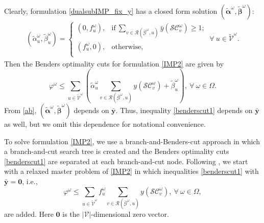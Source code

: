 \documentclass[a4paper,10pt]{article}
\theoremstyle{plain}
\newcommand{\revv}[1]{{#1}}
\begin{document}
{	%
	Clearly, formulation \eqref{dualsubIMP_fix_y} has a closed form solution \revv{$(\tilde{\boldsymbol{{\alpha}}}^{\omega},\tilde{\boldsymbol{{\beta}}}^{\omega})$:
		\begin{equation}\label{ab}
			\begin{aligned}
				(\tilde{\alpha}_u^{\omega},\tilde{\beta}_u^{\omega})=\left\{
				\begin{array}{ll}
					(0,f_u^{\omega}),& {\text{if}}~\sum_{v\in\mathcal{R}(\bar{\mathcal{G}}^{\omega},u)}\bar{y}(\mathcal{SC}_v^{\omega})\geq 1;\\[3pt]
					(f_u^{\omega},0),& \text{otherwise},\\
				\end{array}\right. ~  \forall ~u \in \tilde{\mathcal{V}}^{\omega}.
			\end{aligned}
	\end{equation}}%
	Then the Benders optimality cuts for formulation \eqref{IMP2} are given by
	\revv{\begin{equation}\label{benderscut1}
			\varphi^{\omega}\leq\sum_{u\in\tilde{\mathcal{V}}^{\omega}}\left(\tilde{\alpha}_u^{\omega}\sum_{v\in\mathcal{R}(\bar{\mathcal{G}}^{\omega},u)}y(\mathcal{SC}_v^{\omega})+\tilde{\beta}_u^{\omega}\right),~\forall~ \omega\in\Omega.
		\end{equation}
		From \eqref{ab},  $(\tilde{\boldsymbol{{\alpha}}}^{\omega},\tilde{\boldsymbol{{\beta}}}^{\omega})$  depends on $\bar{\boldsymbol{y}}$.
		Thus, inequality \eqref{benderscut1} depends on $\bar{\boldsymbol{y}}$ as well, but we omit this dependence for notational convenience.}
	
	\revv{To solve formulation \eqref{IMP2}, we use a branch-and-Benders-cut approach in which a branch-and-cut search tree is created and the Benders optimality cuts \eqref{benderscut1} are separated at each branch-and-cut node.
		Following \cite{Guney2020,Wu2017}, we start with a relaxed master problem of  \eqref{IMP2} in which inequalities \eqref{benderscut1} with $\bar{\boldsymbol{y}}=\boldsymbol{0}$, i.e.,
		\begin{equation}\label{subineq}
			\varphi^{\omega}\leq\sum_{u\in\tilde{\mathcal{V}}^{\omega}}f_u^\omega\sum_{v\in\mathcal{R}(\bar{\mathcal{G}}^{\omega},u)}y(\mathcal{SC}_v^{\omega}),~\forall ~\omega\in\Omega,
		\end{equation}
		are added. Here $\boldsymbol{0}$ is the $|\mathcal{V}|$-dimensional zero vector.}
	
}
\end{document}
